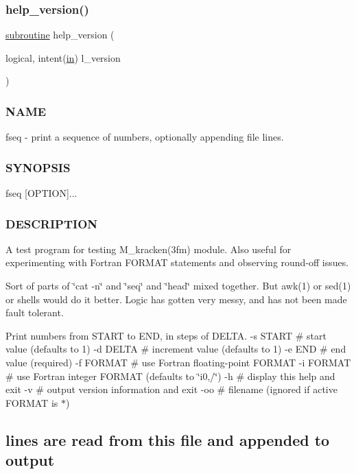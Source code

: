 \subsubsection{\texorpdfstring{help\+\_\+version()}{help\_version()}}
{\footnotesize\ttfamily \hyperlink{M__stopwatch_83_8txt_acfbcff50169d691ff02d4a123ed70482}{subroutine} help\+\_\+version (\begin{DoxyParamCaption}\item[{logical, intent(\hyperlink{M__journal_83_8txt_afce72651d1eed785a2132bee863b2f38}{in})}]{l\+\_\+version }\end{DoxyParamCaption})}



\subsubsection*{N\+A\+ME}

fseq -\/ print a sequence of numbers, optionally appending file lines. \subsubsection*{S\+Y\+N\+O\+P\+S\+IS}

fseq \mbox{[}O\+P\+T\+I\+ON\mbox{]}... \subsubsection*{D\+E\+S\+C\+R\+I\+P\+T\+I\+ON}

A test program for testing M\+\_\+kracken(3fm) module. Also useful for experimenting with Fortran F\+O\+R\+M\+AT statements and observing round-\/off issues.

Sort of parts of \char`\"{}cat -\/n\char`\"{} and \char`\"{}seq\char`\"{} and \char`\"{}head\char`\"{} mixed together. But awk(1) or sed(1) or shells would do it better. Logic has gotten very messy, and has not been made fault tolerant.

Print numbers from S\+T\+A\+RT to E\+ND, in steps of D\+E\+L\+TA. -\/s S\+T\+A\+RT \# start value (defaults to 1) -\/d D\+E\+L\+TA \# increment value (defaults to 1) -\/e E\+ND \# end value (required) -\/f F\+O\+R\+M\+AT \# use Fortran floating-\/point F\+O\+R\+M\+AT -\/i F\+O\+R\+M\+AT \# use Fortran integer F\+O\+R\+M\+AT (defaults to \char`\"{}i0,/\char`\"{}) -\/h \# display this help and exit -\/v \# output version information and exit -\/oo \# filename (ignored if active F\+O\+R\+M\+AT is $\ast$) \subsection*{lines are read from this file and appended to output}

